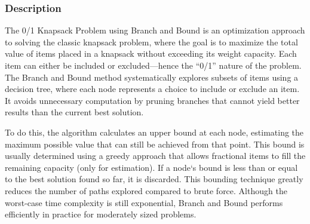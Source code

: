 \subsubsection{Description}

The 0/1 Knapsack Problem using Branch and Bound is an optimization approach to solving the classic knapsack problem, where the goal is to maximize the total value of items placed in a knapsack without exceeding its weight capacity. Each item can either be included or excluded—hence the ``0/1'' nature of the problem. The Branch and Bound method systematically explores subsets of items using a decision tree, where each node represents a choice to include or exclude an item. It avoids unnecessary computation by pruning branches that cannot yield better results than the current best solution.

To do this, the algorithm calculates an upper bound at each node, estimating the maximum possible value that can still be achieved from that point. This bound is usually determined using a greedy approach that allows fractional items to fill the remaining capacity (only for estimation). If a node`s bound is less than or equal to the best solution found so far, it is discarded. This bounding technique greatly reduces the number of paths explored compared to brute force. Although the worst-case time complexity is still exponential, Branch and Bound performs efficiently in practice for moderately sized problems.


